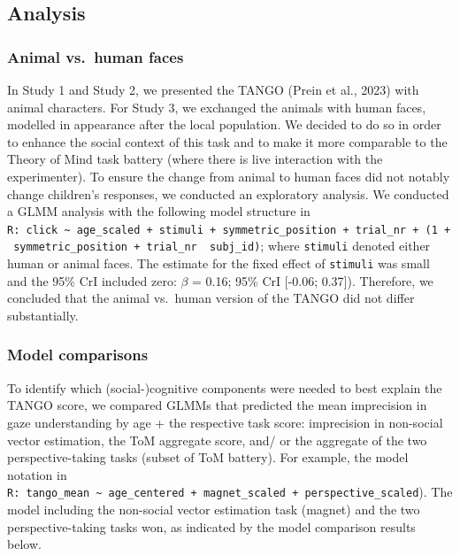 \documentclass[
  man,floatsintext]{apa7}
\begin{document}
\hypertarget{analysis-2}{%
\subsection{Analysis}\label{analysis-2}}

\hypertarget{animal-vs.-human-faces}{%
\subsubsection{Animal vs.~human faces}\label{animal-vs.-human-faces}}

In Study 1 and Study 2, we presented the TANGO (Prein et al., 2023) with animal characters. For Study 3, we exchanged the animals with human faces, modelled in appearance after the local population. We decided to do so in order to enhance the social context of this task and to make it more comparable to the Theory of Mind task battery (where there is live interaction with the experimenter). To ensure the change from animal to human faces did not notably change children's responses, we conducted an exploratory analysis. We conducted a GLMM analysis with the following model structure in \texttt{R:\ click\ \textasciitilde{}\ age\_scaled\ +\ stimuli\ +\ symmetric\_position\ +\ trial\_nr\ +\ (1\ +\ symmetric\_position\ +\ trial\_nr\ \textbar{}\ subj\_id)}; where \texttt{stimuli} denoted either human or animal faces. The estimate for the fixed effect of \texttt{stimuli} was small and the 95\% CrI included zero: \(\beta\) = 0.16; 95\% CrI {[}-0.06; 0.37{]}). Therefore, we concluded that the animal vs.~human version of the TANGO did not differ substantially.

\hypertarget{model-comparisons}{%
\subsubsection{Model comparisons}\label{model-comparisons}}

To identify which (social-)cognitive components were needed to best explain the TANGO score, we compared GLMMs that predicted the mean imprecision in gaze understanding by age + the respective task score: imprecision in non-social vector estimation, the ToM aggregate score, and/ or the aggregate of the two perspective-taking tasks (subset of ToM battery). For example, the model notation in \texttt{R:\ tango\_mean\ \textasciitilde{}\ age\_centered\ +\ magnet\_scaled\ +\ perspective\_scaled}). The model including the non-social vector estimation task (magnet) and the two perspective-taking tasks won, as indicated by the model comparison results below.
\end{document}
